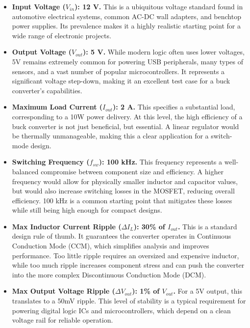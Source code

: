 \documentclass[12pt, a4paper]{article}
\begin{document}
\begin{itemize}

    \item \textbf{Input Voltage ($V_{in}$): 12 V.} This is a ubiquitous voltage standard found in automotive electrical systems, common AC-DC wall adapters, and benchtop power supplies. Its prevalence makes it a highly realistic starting point for a wide range of electronic projects.

    \item \textbf{Output Voltage ($V_{out}$): 5 V.} While modern logic often uses lower voltages, 5V remains extremely common for powering USB peripherals, many types of sensors, and a vast number of popular microcontrollers. It represents a significant voltage step-down, making it an excellent test case for a buck converter's capabilities.

    \item \textbf{Maximum Load Current ($I_{out}$): 2 A.} This specifies a substantial load, corresponding to a 10W power delivery. At this level, the high efficiency of a buck converter is not just beneficial, but essential. A linear regulator would be thermally unmanageable, making this a clear application for a switch-mode design.

    \item \textbf{Switching Frequency ($f_{sw}$): 100 kHz.} This frequency represents a well-balanced compromise between component size and efficiency. A higher frequency would allow for physically smaller inductor and capacitor values, but would also increase switching losses in the MOSFET, reducing overall efficiency. 100 kHz is a common starting point that mitigates these losses while still being high enough for compact designs.

    \item \textbf{Max Inductor Current Ripple ($\Delta I_L$): 30\% of $I_{out}$.} This is a standard design rule of thumb. It guarantees the converter operates in Continuous Conduction Mode (CCM), which simplifies analysis and improves performance. Too little ripple requires an oversized and expensive inductor, while too much ripple increases component stress and can push the converter into the more complex Discontinuous Conduction Mode (DCM).

    \item \textbf{Max Output Voltage Ripple ($\Delta V_{out}$): 1\% of $V_{out}$.} For a 5V output, this translates to a 50mV ripple. This level of stability is a typical requirement for powering digital logic ICs and microcontrollers, which depend on a clean voltage rail for reliable operation.

\end{itemize}
\end{document}
